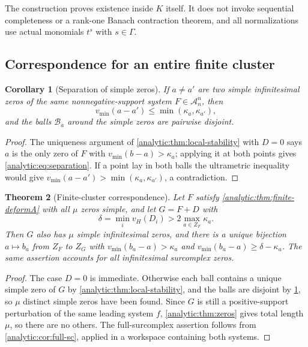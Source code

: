 \documentclass[11pt,letterpaper]{article}
\newtheorem{theorem}{Theorem}[section]
\newtheorem{corollary}[theorem]{Corollary}
\theoremstyle{definition}
\theoremstyle{remark}
\newcommand{\A}{\mathscr A}
\newcommand{\vH}{v_{\!H}}
\newcommand{\vmin}{v_{\min}}
\numberwithin{equation}{section}
\begin{document}
The construction proves existence inside $K$ itself. It does not invoke
sequential completeness or a rank-one Banach contraction theorem, and all
normalizations use actual monomials $t^s$ with $s\in\Gamma$.

\subsection{Correspondence for an entire finite cluster}
\begin{corollary}[Separation of simple zeros]
\label{analytic:cor:separation}
If $a\ne a'$ are two simple infinitesimal zeros of the same
nonnegative-support system $F\in\A_n^n$, then
\begin{equation}\label{analytic:eq:separation}
 \vmin(a-a')\le\min(\kappa_a,\kappa_{a'}),
\end{equation}
and the balls $\mathcal B_a$ around the simple zeros are pairwise disjoint.
\end{corollary}
\begin{proof}
The uniqueness argument of \cref{analytic:thm:local-stability} with $D=0$
says $a$ is the only zero of $F$ with $\vmin(b-a)>\kappa_a$; applying it at
both points gives \eqref{analytic:eq:separation}. If a point lay in both
balls the ultrametric inequality would give
$\vmin(a-a')>\min(\kappa_a,\kappa_{a'})$, a contradiction.
\end{proof}

\begin{theorem}[Finite-cluster correspondence]
\label{analytic:thm:cluster-stability}
Let $F$ satisfy \cref{analytic:thm:finite-deformA} with all $\mu$ zeros
simple, and let $G=F+D$ with
\begin{equation}\label{analytic:eq:global-threshold}
 \delta=\min_i\vH(D_i)>2\max_{a\in Z_F}\kappa_a .
\end{equation}
Then $G$ also has $\mu$ simple infinitesimal zeros, and there is a unique
bijection $a\mapsto b_a$ from $Z_F$ to $Z_G$ with $\vmin(b_a-a)>\kappa_a$
and $\vmin(b_a-a)\ge\delta-\kappa_a$. The same assertion accounts for all
infinitesimal surcomplex zeros.
\end{theorem}
\begin{proof}
The case $D=0$ is immediate. Otherwise each ball contains a unique simple
zero of $G$ by \cref{analytic:thm:local-stability}, and the balls are
disjoint by \cref{analytic:cor:separation}, so $\mu$ distinct simple zeros
have been found. Since $G$ is still a positive-support perturbation of the
same leading system $f$, \cref{analytic:thm:zeros} gives total length $\mu$,
so there are no others. The full-surcomplex assertion follows from
\cref{analytic:cor:full-sc}, applied in a workspace containing both
systems.
\end{proof}
\end{document}
